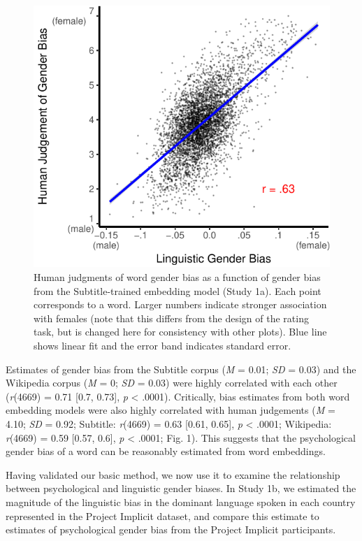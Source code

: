 \documentclass[9pt,twocolumn,twoside,lineno]{pnas-new}
\begin{document}
\begin{figure}
\centering
\includegraphics[width=.8\linewidth]{pnas_rmd/iat_lang_pnas_files/figure-latex/unnamed-chunk-10-1.pdf}
\caption{\label{fig:unnamed-chunk-10}Human judgments of word gender bias as
a function of gender bias from the Subtitle-trained embedding model
(Study 1a). Each point corresponds to a word. Larger numbers indicate
stronger association with females (note that this differs from the
design of the rating task, but is changed here for consistency with
other plots). Blue line shows linear fit and the error band indicates
standard error.}
\end{figure}

Estimates of gender bias from the Subtitle corpus (\emph{M} = 0.01;
\emph{SD} = 0.03) and the Wikipedia corpus (\emph{M} = 0; \emph{SD} =
0.03) were highly correlated with each other (\emph{r}(4669) = 0.71 {[}0.7, 0.73{]}, \emph{p} \textless{} .0001). Critically, bias estimates from both word embedding
models were also highly correlated with human judgements (\emph{M} = 4.10; \emph{SD} = 0.92; Subtitle: \emph{r}(4669) = 0.63 {[}0.61, 0.65{]}, \emph{p} \textless{} .0001; Wikipedia: \emph{r}(4669) = 0.59 {[}0.57, 0.6{]}, \emph{p} \textless{} .0001; Fig. 1). This suggests that the psychological gender bias of a word can be reasonably estimated from word embeddings.

Having validated our basic method, we now use it to examine the relationship
between psychological and linguistic gender biases. In Study 1b, we
estimated the magnitude of the linguistic bias in the dominant language
spoken in each country represented in the Project Implicit dataset, and
compare this estimate to estimates of psychological gender bias from the
Project Implicit participants.
\end{document}
